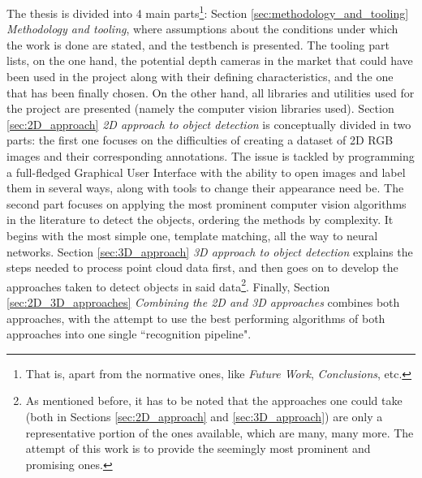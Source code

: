 \documentclass[../main.tex]{subfiles}
\begin{document}
The thesis is divided into 4 main parts\footnote{That is, apart from the normative ones, like \emph{Future Work}, \emph{Conclusions}, etc.}: Section \ref{sec:methodology_and_tooling} \emph{Methodology and tooling}, where assumptions about the conditions under which the work is done are stated, and the testbench is presented. The tooling part lists, on the one hand, the potential depth cameras in the market that could have been used in the project along with their defining characteristics, and the one that has been finally chosen. On the other hand, all libraries and utilities used for the project are presented (namely the computer vision libraries used). Section \ref{sec:2D_approach} \emph{2D approach to object detection} is conceptually divided in two parts: the first one focuses on the difficulties of creating a dataset of 2D RGB images and their corresponding annotations. The issue is tackled by programming a full-fledged Graphical User Interface with the ability to open images and label them in several ways, along with tools to change their appearance need be. The second part focuses on applying the most prominent computer vision algorithms in the literature to detect the objects, ordering the methods by complexity. It begins with the most simple one, template matching, all the way to neural networks. Section \ref{sec:3D_approach} \emph{3D approach to object detection} explains the steps needed to process point cloud data first, and then goes on to develop the approaches taken to detect objects in said data\footnote{As mentioned before, it has to be noted that the approaches one could take (both in Sections \ref{sec:2D_approach} and \ref{sec:3D_approach}) are only a representative portion of the ones available, which are many, many more. The attempt of this work is to provide the seemingly most prominent and promising ones.}. Finally, Section \ref{sec:2D_3D_approaches} \emph{Combining the 2D and 3D approaches} combines both approaches, with the attempt to use the best performing algorithms of both approaches into one single ``recognition pipeline".



 
\end{document}
